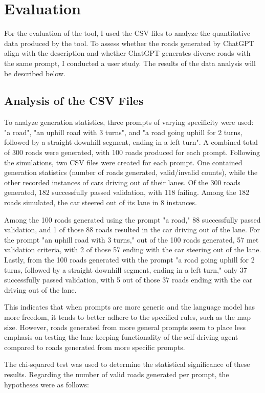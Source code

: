 \chapter{Evaluation}
For the evaluation of the tool, I used the CSV files to analyze the quantitative data produced by the tool. To assess whether the roads generated by ChatGPT align with the description and whether ChatGPT generates diverse roads with the same prompt, I conducted a user study. The results of the data analysis will be described below.

\section{Analysis of the CSV Files}
To analyze generation statistics, three prompts of varying specificity were used: "a road", "an uphill road with 3 turns", and "a road going uphill for 2 turns, followed by a straight downhill segment, ending in a left turn". A combined total of 300 roads were generated, with 100 roads produced for each prompt. Following the simulations, two CSV files were created for each prompt. One contained generation statistics (number of roads generated, valid/invalid counts), while the other recorded instances of cars driving out of their lanes. Of the 300 roads generated, 182 successfully passed validation, with 118 failing. Among the 182 roads simulated, the car steered out of its lane in 8 instances.

Among the 100 roads generated using the prompt "a road," 88 successfully passed validation, and 1 of those 88 roads resulted in the car driving out of the lane. For the prompt "an uphill road with 3 turns," out of the 100 roads generated, 57 met validation criteria, with 2 of those 57 ending with the car steering out of the lane. Lastly, from the 100 roads generated with the prompt "a road going uphill for 2 turns, followed by a straight downhill segment, ending in a left turn," only 37 successfully passed validation, with 5 out of those 37 roads ending with the car driving out of the lane.

This indicates that when prompts are more generic and the language model has more freedom, it tends to better adhere to the specified rules, such as the map size. However, roads generated from more general prompts seem to place less emphasis on testing the lane-keeping functionality of the self-driving agent compared to roads generated from more specific prompts.

The chi-squared test was used to determine the statistical significance of these results. Regarding the number of valid roads generated per prompt, the hypotheses were as follows:


